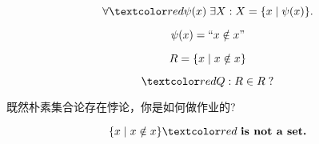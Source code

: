 \begin{frame}{}
  \begin{theorem}[概括原则]
    \[
      \forall \red{\psi(x)}\; \exists X: X = \set{x \mid \psi(x)}.
    \]
  \end{theorem}

  \pause
  \begin{definition}
    \[
      \psi(x) = ``x \notin x"
    \]

    \pause
    \[
      R = \{x \mid x \notin x\}
    \]

    \pause
    \[
      \red{Q: R \in R\;?}
    \]
  \end{definition}
\end{frame}

\begin{frame}{}
  \begin{center}
     既然朴素集合论存在悖论，你是如何做作业的?
    \vspace{0.60cm}
  \end{center}
\end{frame}

\begin{frame}{}
  \begin{center}

    \pause
    \vspace{0.20cm}
    \begin{theorem}
      \[
        \set{x \mid x \notin x} \red{\text{\bf \;is not a set.}}
      \]
    \end{theorem}
  \end{center}
\end{frame}
